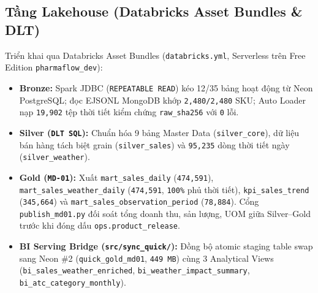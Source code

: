 \subsection{Tầng Lakehouse (Databricks Asset Bundles \& DLT)}
Triển khai qua Databricks Asset Bundles (\texttt{databricks.yml}, Serverless trên Free Edition \texttt{pharmaflow\_dev}):
\begin{itemize}[leftmargin=1.5em]
  \item \textbf{Bronze:} Spark JDBC (\texttt{REPEATABLE READ}) kéo 12/35 bảng hoạt động từ Neon PostgreSQL; đọc EJSONL MongoDB khớp \texttt{2,480/2,480} SKU; Auto Loader nạp \texttt{19,902} tệp thời tiết kiểm chứng \texttt{raw\_sha256} với \texttt{0} lỗi.
  \item \textbf{Silver (\texttt{DLT SQL}):} Chuẩn hóa 9 bảng Master Data (\texttt{silver\_core}), dữ liệu bán hàng tách biệt grain (\texttt{silver\_sales}) và \texttt{95,235} dòng thời tiết ngày (\texttt{silver\_weather}).
  \item \textbf{Gold (\texttt{MD-01}):} Xuất \texttt{mart\_sales\_daily} (\texttt{474,591}), \texttt{mart\_sales\_weather\_daily} (\texttt{474,591}, \texttt{100\%} phủ thời tiết), \texttt{kpi\_sales\_trend} (\texttt{345,664}) và \texttt{mart\_sales\_observation\_period} (\texttt{78,884}). Cổng \texttt{publish\_md01.py} đối soát tổng doanh thu, sản lượng, UOM giữa Silver--Gold trước khi đóng dấu \texttt{ops.product\_release}.
  \item \textbf{BI Serving Bridge (\texttt{src/sync\_quick/}):} Đồng bộ atomic staging table swap sang Neon \#2 (\texttt{quick\_gold\_md01}, \texttt{449 MB}) cùng 3 Analytical Views (\texttt{bi\_sales\_weather\_enriched}, \texttt{bi\_weather\_impact\_summary}, \texttt{bi\_atc\_category\_monthly}).
\end{itemize}


